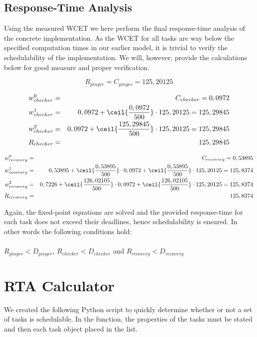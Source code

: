 \section{Response-Time Analysis} %
\label{sec:response_time_analysis_of_watchdog}
Using the measured WCET we here perform the final response-time analysis of the concrete implementation. As the WCET for all tasks are way below the specified computation times in our earlier model, it is trivial to verify the schedulability of the implementation. We will, however, provide the calculations below for good measure and proper verification.

\begin{equation}
\label{eq:pingerrta}
     R_{pinger} = C_{pinger} = 125,20125
\end{equation}

\begin{eqnarray}
    w_{checker}^0 &=& C_{checker} = 0,0972 \nonumber \\ 
    w_{checker}^1 &=& 0,0972 + \ceil{\frac{0,0972}{500}} \cdot 125,20125 = 125,29845 \nonumber \\ 
    w_{checker}^2 &=& 0,0972 + \ceil{\frac{125,29845}{500}} \cdot 125,20125 = 125,29845 \nonumber \\
    R_{checker} &=& 125,29845
\end{eqnarray}

\begin{eqnarray}
    w_{recovery}^0 &=& C_{recovery} = 0,53895 \nonumber \\ 
    w_{recovery}^1 &=& 0,53895 + \ceil{\frac{0,53895}{500}} \cdot 0,0972 + \ceil{\frac{0,53895}{500}} \cdot 125,20125 = 125,8374 \nonumber \\ 
    w_{recovery}^2 &=& 0,7226 + \ceil{\frac{126,02105}{500}} \cdot 0,0972 + \ceil{\frac{126,02105}{500}} \cdot 125,20125 = 125,8374 \nonumber \\
    R_{recovery} &=& 125,8374
\end{eqnarray}

Again, the fixed-point equations are solved and the provided response-time for each task does not exceed their deadlines, hence schedulability is ensured. In other words the following conditions hold: \\\\
$R_{pinger} < D_{pinger}$, $R_{checker} < D_{checker}$ and $R_{recovery} < D_{recovery}$


\chapter{RTA Calculator} %
We created the following Python script to quickly determine whether or not a set of tasks is schedulable. In the  function, the properties of the tasks must be stated and then each task object placed in the  list.
\label{cha:rta_calculator}

